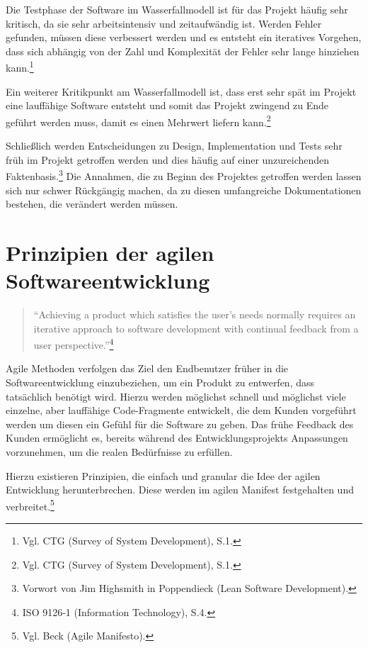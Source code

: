             Die Testphase der Software im Wasserfallmodell ist für das Projekt häufig sehr kritisch, da sie sehr arbeitsintensiv und zeitaufwändig ist. Werden Fehler gefunden, müssen diese verbessert werden und es entsteht ein iteratives Vorgehen, dass sich abhängig von der Zahl und Komplexität der Fehler sehr lange hinziehen kann.\footnote{Vgl. CTG (Survey of System Development), S.1.}

            Ein weiterer Kritikpunkt am Wasserfallmodell ist, dass erst sehr spät im Projekt eine lauffähige Software entsteht und somit das Projekt zwingend zu Ende geführt werden muss, damit es einen Mehrwert liefern kann.\footnote{Vgl. CTG (Survey of System Development), S.1.}

            Schließlich werden Entscheidungen zu Design, Implementation und Tests sehr früh im Projekt getroffen werden und dies häufig auf einer unzureichenden Faktenbasis.\footnote{Vorwort von Jim Highsmith in Poppendieck (Lean Software Development).} Die Annahmen, die zu Beginn des Projektes getroffen werden lassen sich nur schwer Rückgängig machen, da zu diesen umfangreiche Dokumentationen bestehen, die verändert werden müssen.

%
%
    \section{Prinzipien der agilen Softwareentwicklung}
    \label{sec:agilePrinzipien}

        \begin{quote}
          \enquote{Achieving a product which satisfies the user's needs normally requires an iterative approach to software development with continual feedback from a user perspective.}\footnote{ISO 9126-1 (Information Technology), S.4.}
        \end{quote}

        Agile Methoden verfolgen das Ziel den Endbenutzer früher in die Softwareentwicklung einzubeziehen, um ein Produkt zu entwerfen, dass tatsächlich benötigt wird. Hierzu werden möglichst schnell und möglichst viele einzelne, aber lauffähige Code-Fragmente entwickelt, die dem Kunden vorgeführt werden um diesen ein Gefühl für die Software zu geben. Das frühe Feedback des Kunden ermöglicht es, bereits während des Entwicklungsprojekts Anpassungen vorzunehmen, um die realen Bedürfnisse zu erfüllen.

        Hierzu existieren Prinzipien, die einfach und granular die Idee der agilen Entwicklung herunterbrechen. Diese werden im agilen Manifest festgehalten und verbreitet.\footnote{Vgl. Beck (Agile Manifesto).}

